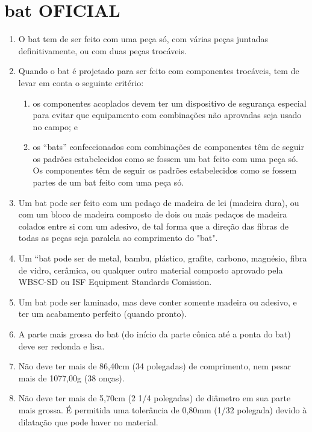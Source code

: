 \section{\gls{bat} OFICIAL }\label{sec:bat}
\begin{multicols}{2}
	\begin{enumerate}[label= \arabic*)]
		\item  O \gls{bat} tem de ser feito com uma pe\c{c}a s\'o, com v\'arias pe\c{c}as juntadas 
		definitivamente, ou com duas pe\c{c}as troc\'aveis. 
		\item Quando o \gls{bat} \'e projetado para ser feito com componentes troc\'aveis, tem de levar em conta o seguinte crit\'erio: 
		\begin{enumerate}[label=\roman*.]
			\item os componentes acoplados devem ter um dispositivo de seguran\c{c}a especial para evitar que equipamento com combina\c{c}ões n\~ao aprovadas seja usado no campo; e 
			\item os “bats” confeccionados com combina\c{c}ões de componentes t\^em de seguir os padrões estabelecidos como se fossem um \gls{bat} feito com uma pe\c{c}a s\'o. Os componentes t\^em de seguir os padrões estabelecidos como se fossem partes de um \gls{bat} feito com uma pe\c{c}a s\'o. 
		\end{enumerate}
		\item  Um \gls{bat} pode ser feito com um peda\c{c}o de madeira de lei (madeira dura), ou com um bloco de madeira composto de dois ou mais peda\c{c}os de madeira colados entre si com um adesivo, de tal forma que a dire\c{c}\~ao das fibras de todas as pe\c{c}as seja paralela ao comprimento do "bat". 
		\item  Um “bat pode ser de metal, bambu, pl\'astico, grafite, carbono, magn\'esio, fibra de vidro, cer\^amica, ou qualquer outro material composto aprovado pela WBSC-SD ou ISF Equipment Standards Comission. 
		\item  Um \gls{bat} pode ser laminado, mas deve conter somente madeira ou adesivo, e ter um acabamento perfeito (quando pronto). 
		\item  A parte mais grossa do \gls{bat} (do início da parte cônica at\'e a ponta do \gls{bat}) deve ser redonda e lisa. 
		\item  N\~ao deve ter mais de 86,40cm (34 polegadas) de comprimento, nem pesar mais de 1077,00g (38 on\c{c}as). 
		\item  N\~ao deve ter mais de 5,70cm (2 1/4 polegadas) de di\^ametro em sua parte mais grossa. É permitida uma toler\^ancia de 0,80mm (1/32 polegada) devido \`a dilata\c{c}\~ao que pode haver no material. 

\end{enumerate}
\end{multicols}
